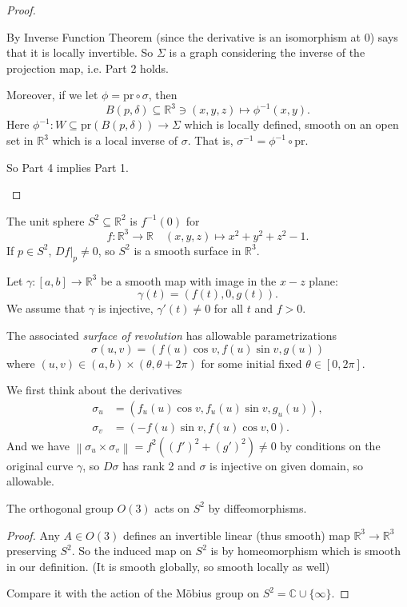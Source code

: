 \begin{proof}
\begin{enumerate}
        By Inverse Function Theorem (since the derivative is an isomorphism at 0) says that it is locally invertible. So \(\Sigma\) is a graph considering the inverse of the projection map, i.e. Part 2 holds.

        Moreover, if we let \(\phi = \mathrm{pr}\circ \sigma\), then
        \[
            B(p, \delta) \subseteq \mathbb{R}^3\ni (x,y,z) \mapsto \phi^{-1}(x,y).
        \]
        Here \(\phi^{-1}: W \subseteq \mathrm{pr}(B(p, \delta)) \to \Sigma\) which is locally defined, smooth on an open set in \(\mathbb{R}^3\) which is a local inverse of \(\sigma\). That is, \(\sigma^{-1} = \phi^{-1}\circ \mathrm{pr}\).

        So Part 4 implies Part 1.
    \end{enumerate}
\end{proof}
\begin{example}
    The unit sphere \(S^2 \subseteq \mathbb{R}^2\) is \(f^{-1}(0)\) for
    \[
        f: \mathbb{R}^3 \to \mathbb{R} \quad (x,y,z) \mapsto x^2 + y^2 + z^2 - 1.
    \]
    If \(p \in S^2\), \(\left. Df\right|_p \neq 0\), so \(S^2\) is a smooth surface in \(\mathbb{R}^3\).
\end{example}
\begin{example}
    Let \(\gamma: [a,b] \to \mathbb{R}^3\) be a smooth map with image in the \(x-z\) plane:
    \[
        \gamma(t) = (f(t), 0, g(t)).
    \]
    We assume that \(\gamma\) is injective, \(\gamma'(t)\neq 0\) for all \(t\) and \(f > 0\).

    The associated \textit{surface of revolution} has allowable parametrizations
    \[
        \sigma(u,v) = (f(u)\cos v, f(u)\sin v, g(u))
    \]
    where \((u,v) \in (a,b) \times (\theta, \theta + 2 \pi)\) for some initial fixed \(\theta \in [0, 2\pi]\).
\end{example}
\begin{note}
    We first think about the derivatives
    \begin{align*}
        \sigma_u &= (f_u(u)\cos v, f_u(u)\sin v, g_u(u)),\\
        \sigma_v &= (-f(u)\sin v, f(u)\cos v, 0).
    \end{align*}
    And we have \(\left\lVert \sigma_u \times \sigma_v\right\rVert=f^2((f')^2 + (g')^2)\neq 0\) by conditions on the original curve \(\gamma\), so \(D\sigma\) has rank 2 and \(\sigma\) is injective on given domain, so allowable.
\end{note}
\begin{example}
    The orthogonal group \(O(3)\) acts on \(S^2\) by diffeomorphisms.
\end{example}
\begin{proof}
    Any \(A\in O(3)\) defines an invertible linear (thus smooth) map \(\mathbb{R}^3 \to \mathbb{R}^3\) preserving \(S^2\). So the induced map on \(S^2\) is by homeomorphism which is smooth in our definition. (It is smooth globally, so smooth locally as well)

    Compare it with the action of the Möbius group on \(S^2 = \mathbb{C}\cup \{\infty\}\).
\end{proof}